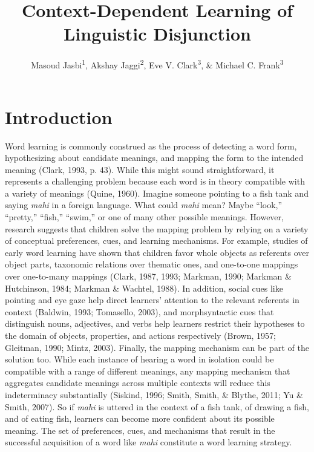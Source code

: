 \documentclass[
  english,
  ,man,floatsintext]{apa6}
\title{Context-Dependent Learning of Linguistic Disjunction}
\author{Masoud Jasbi\textsuperscript{1}, Akshay Jaggi\textsuperscript{2}, Eve V. Clark\textsuperscript{3}, \& Michael C. Frank\textsuperscript{3}}
\date{}
\affiliation{\vspace{0.5cm}\textsuperscript{1} University of California, Davis\\\textsuperscript{2} Harvard Medical School\\\textsuperscript{3} Stanford University}
\begin{document}
\maketitle

\hypertarget{introduction}{%
\section{Introduction}\label{introduction}}

Word learning is commonly construed as the process of detecting a word form, hypothesizing about candidate meanings, and mapping the form to the intended meaning (Clark, 1993, p. 43). While this might sound straightforward, it represents a challenging problem because each word is in theory compatible with a variety of meanings (Quine, 1960). Imagine someone pointing to a fish tank and saying \emph{mahi} in a foreign language. What could \emph{mahi} mean? Maybe ``look,'' ``pretty,'' ``fish,'' ``swim,'' or one of many other possible meanings. However, research suggests that children solve the mapping problem by relying on a variety of conceptual preferences, cues, and learning mechanisms. For example, studies of early word learning have shown that children favor whole objects as referents over object parts, taxonomic relations over thematic ones, and one-to-one mappings over one-to-many mappings (Clark, 1987, 1993; Markman, 1990; Markman \& Hutchinson, 1984; Markman \& Wachtel, 1988). In addition, social cues like pointing and eye gaze help direct learners' attention to the relevant referents in context (Baldwin, 1993; Tomasello, 2003), and morphsyntactic cues that distinguish nouns, adjectives, and verbs help learners restrict their hypotheses to the domain of objects, properties, and actions respectively (Brown, 1957; Gleitman, 1990; Mintz, 2003). Finally, the mapping mechanism can be part of the solution too. While each instance of hearing a word in isolation could be compatible with a range of different meanings, any mapping mechanism that aggregates candidate meanings across multiple contexts will reduce this indeterminacy substantially (Siskind, 1996; Smith, Smith, \& Blythe, 2011; Yu \& Smith, 2007). So if \emph{mahi} is uttered in the context of a fish tank, of drawing a fish, and of eating fish, learners can become more confident about its possible meaning. The set of preferences, cues, and mechanisms that result in the successful acquisition of a word like \emph{mahi} constitute a word learning strategy.
\end{document}
